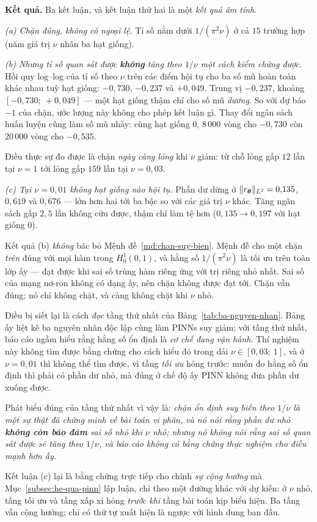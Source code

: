 \textbf{Kết quả.} Ba kết luận, và kết luận thứ hai là một \emph{kết quả âm tính}.

\emph{(a) Chặn đúng, không có ngoại lệ.} Tỉ số nằm dưới $1/(\pi^2\nu)$ ở cả
$15$ trường hợp (năm giá trị $\nu$ nhân ba hạt giống).

\emph{(b) Nhưng tỉ số quan sát được \textbf{không} tăng theo $1/\nu$ một cách
kiểm chứng được.} Hồi quy log--log của tỉ số theo $\nu$ trên các điểm hội tụ cho
ba số mũ hoàn toàn khác nhau tuỳ hạt giống: $-0{,}730$, $-0{,}237$ và
$+0{,}049$. Trung vị $-0{,}237$, khoảng $[-0{,}730;\ +0{,}049]$ --- một hạt
giống thậm chí cho số mũ \emph{dương}. So với dự báo $-1$ của chặn, ước lượng
này không cho phép kết luận gì. Thay đổi ngân sách huấn luyện cũng làm số mũ
nhảy: cùng hạt giống $0$, $8\,000$ vòng cho $-0{,}730$ còn $20\,000$ vòng cho
$-0{,}535$.

Điều thực sự đo được là chặn \emph{ngày càng lỏng} khi $\nu$ giảm: từ chỗ lỏng
gấp $12$ lần tại $\nu = 1$ tới lỏng gấp $159$ lần tại $\nu = 0{,}03$.

\emph{(c) Tại $\nu = 0{,}01$ không hạt giống nào hội tụ.} Phần dư dừng ở
$\lVert r_{\bm{\theta}}\rVert_{L^2} = 0{,}135$, $0{,}619$ và $0{,}676$ --- lớn hơn hai tới
ba bậc so với các giá trị $\nu$ khác. Tăng ngân sách gấp $2{,}5$ lần không cứu
được, thậm chí làm tệ hơn ($0{,}135 \to 0{,}197$ với hạt giống $0$).

\begin{nhanxet}
\label{nx:doc-tn7}
Kết quả (b) \emph{không} bác bỏ Mệnh đề~\ref{md:chan-suy-bien}. Mệnh đề cho một
chặn \emph{trên} đúng với mọi hàm trong $H^1_0(0,1)$, và hằng số $1/(\pi^2\nu)$
là tối ưu trên toàn lớp ấy --- đạt được khi sai số trùng hàm riêng ứng với trị
riêng nhỏ nhất. Sai số của mạng nơ-ron không có dạng ấy, nên chặn không được đạt
tới. Chặn vẫn đúng; nó chỉ không chặt, và càng không chặt khi $\nu$ nhỏ.

Điều bị siết lại là cách \emph{đọc} tầng thứ nhất của
Bảng~\ref{tab:ba-nguyen-nhan}. Bảng ấy liệt kê ba nguyên nhân độc lập cùng làm
PINNs suy giảm; với tầng thứ nhất, báo cáo ngầm hiểu rằng hằng số ổn định là
\emph{cơ chế đang vận hành}. Thí nghiệm này không tìm được bằng chứng cho cách
hiểu đó trong dải $\nu \in [0{,}03;\ 1]$, và ở $\nu = 0{,}01$ thì không thể tìm
được, vì tầng \emph{tối ưu} hỏng trước: muốn đo hằng số ổn định thì phải có phần
dư nhỏ, mà đúng ở chế độ ấy PINN không đưa phần dư xuống được.

Phát biểu đúng của tầng thứ nhất vì vậy là: \emph{chặn ổn định suy biến theo
$1/\nu$ là một sự thật đã chứng minh về bài toán vi phân, và nó nói rằng phần dư
nhỏ \textbf{không còn bảo đảm} sai số nhỏ khi $\nu$ nhỏ; nhưng nó không nói
rằng sai số quan sát được sẽ tăng theo $1/\nu$, và báo cáo không có bằng chứng
thực nghiệm cho điều mạnh hơn ấy.}

Kết luận (c) lại là bằng chứng trực tiếp cho chính \emph{sự cộng hưởng} mà
Mục~\ref{subsec:he-qua-pinn} lập luận, chỉ theo một đường khác với dự kiến: ở
$\nu$ nhỏ, tầng tối ưu và tầng xấp xỉ hỏng \emph{trước khi} tầng bài toán kịp
biểu hiện. Ba tầng vẫn cộng hưởng; chỉ có thứ tự xuất hiện là ngược với hình
dung ban đầu.
\end{nhanxet}

